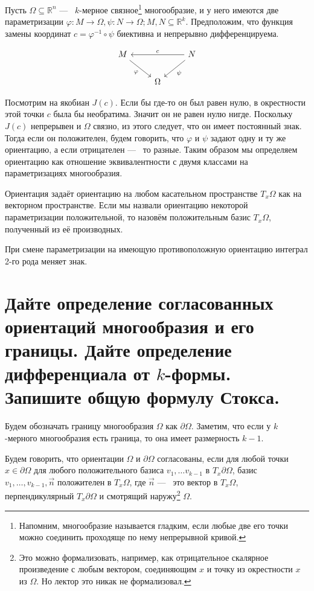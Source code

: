 \documentclass{article}
\begin{document}
	Пусть $\Omega \subseteq \mathbb{R}^n$ ---~ $k$-мерное связное\footnote{Напомним, многообразие называется гладким, если любые две его точки можно соединить проходяще по нему непрерывной кривой.} многообразие, и у него имеются две параметризации $\varphi: M \to \Omega, \psi: N \to \Omega; M, N \subseteq \mathbb{R}^k$. Предположим, что функция замены координат $c = \varphi^{-1} \circ \psi$ биективна и непрерывно дифференцируема.

	\[ \begin{tikzcd}
		M \arrow[swap]{rd}{\varphi} &  &\arrow[swap]{ll}{c} N \arrow{ld}{\psi} \\
		& \Omega
	\end{tikzcd} \]

	Посмотрим на якобиан $J(c)$. Если бы где-то он был равен нулю, в окрестности этой точки $c$ была бы необратима. Значит он не равен нулю нигде. Поскольку $J(c)$ непрерывен и $\Omega$ связно, из этого следует, что он имеет постоянный знак. Тогда если он положителен, будем говорить, что $\varphi$ и $\psi$ задают одну и ту же ориентацию, а если отрицателен ---~ то разные. Таким образом мы определяем ориентацию как отношение эквивалентности с двумя классами на параметризациях многообразия.

	Ориентация задаёт ориентацию на любом касательном пространстве $T_{x}\Omega$ как на векторном пространстве. Если мы назвали ориентацию некоторой параметризации положительной, то назовём положительным базис $T_x \Omega$, полученный из её производных.

	При смене параметризации на имеющую противоположную ориентацию интеграл 2-го рода меняет знак. 

	\section{Дайте определение согласованных ориентаций многообразия и его границы. Дайте определение дифференциала от $k$-формы. Запишите общую формулу Стокса.}
	Будем обозначать границу многообразия $\Omega$ как $\partial \Omega$. Заметим, что если у $k$-мерного многообразия есть граница, то она имеет размерность $k - 1$.

	\begin{definition}
		Будем говорить, что ориентации $\Omega$ и $\partial \Omega$ согласованы, если для любой точки $x \in \partial \Omega$ для любого положительного базиса $v_1, \ldots v_{k - 1}$ в $T_x \partial \Omega$, базис $v_1, \ldots, v_{k - 1}, \vec{n}$ положителен в $T_x \Omega$, где $\vec{n}$ ---~ это вектор в $T_x \Omega$, перпендикулярный $T_x \partial \Omega$ и смотрящий наружу\footnote{Это можно формализовать, например, как отрицательное скалярное произведение с любым вектором, соединяющим $x$ и точку из окрестности $x$ из $\Omega$. Но лектор это никак не формализовал.} $\Omega$.
	\end{definition}
\end{document}
